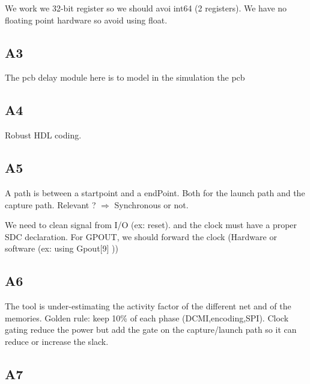 We work we 32-bit register so we should avoi int64 (2 registers). We have no floating point hardware so avoid using float.


\subsection{A3}

The pcb delay module here is to model in the simulation the pcb


\subsection{A4}
Robust HDL coding.


\subsection{A5}
A path is between a startpoint and a endPoint. Both for the launch path and the capture path. Relevant ? \(\Rightarrow\) Synchronous or not.

We need to clean signal from I/O (ex: reset). and the clock must have a proper SDC declaration. For GPOUT, we should forward the clock (Hardware or software (ex: using Gpout[9] ))


\subsection{A6}

The tool is under-estimating the activity factor of the different net and of the memories. Golden rule: keep 10\% of each phase (DCMI,encoding,SPI). Clock gating reduce the power but add the gate on the capture/launch path so it can reduce  or increase the slack.



\subsection{A7}
